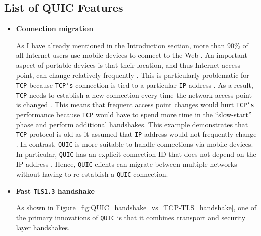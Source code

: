 \documentclass[12pt,a4paper,twoside,openright]{report}
\begin{document}
\subsection{List of QUIC Features}
\begin{itemize}


 \item \textbf{Connection migration} 
 
    As I have already mentioned in the Introduction section, more than 90\% of all Internet users use mobile devices to connect to the Web \cite{bib_number_of_mobile_users}.
    An important aspect of portable devices is that their location, and thus Internet access point, can change relatively frequently \cite{PollardBarry2019HiAP}.
    This is particularly problematic for \texttt{TCP} because \texttt{TCP's} connection is tied to a particular \texttt{IP} address \cite{PollardBarry2019HiAP}.
    As a result, \texttt{TCP} needs to establish a new connection every time the network access point is changed \cite{PollardBarry2019HiAP}.
    This means that frequent access point changes would hurt \texttt{TCP's} performance because \texttt{TCP} would have to spend more time in the \enquote{slow-start} phase and perform additional handshakes.
    This example demonstrates that \texttt{TCP} protocol is old as it assumed that \texttt{IP} address would not frequently change \cite{PollardBarry2019HiAP}.
    In contrast, \texttt{QUIC} is more suitable to handle connections via mobile devices.
    In particular, \texttt{QUIC} has an explicit connection ID that does not depend on the IP address \cite{PollardBarry2019HiAP}.
    Hence, \texttt{QUIC} clients can migrate between multiple networks without having to re-establish a \texttt{QUIC} connection.
    
    
    





\item \textbf{Fast \texttt{TLS1.3} handshake}

As shown in Figure~\ref{fig:QUIC_handshake_vs_TCP-TLS_handshake}, one of the primary innovations of \texttt{QUIC} is that it combines transport and security layer handshakes.



\end{itemize}
\end{document}
